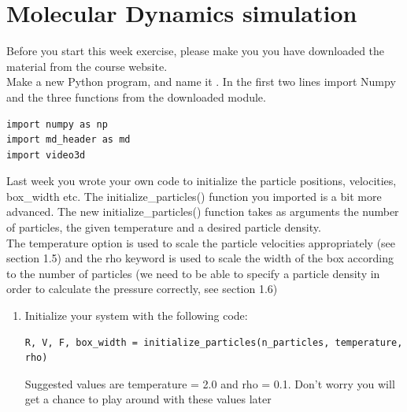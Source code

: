 \documentclass{article}
\begin{document}
\newpage

\section{Molecular Dynamics simulation}

Before you start this week exercise, please make you you have downloaded the
material from the course website.\\


Make a new Python program, and name it .
In the first two lines import Numpy and the three functions from the downloaded
module.

\begin{lstlisting}
import numpy as np
import md_header as md
import video3d
\end{lstlisting}

Last week you wrote your own code to initialize the particle positions,
velocities, box\_width etc. The initialize\_particles() function you
imported is a bit more advanced.
The new initialize\_particles() function takes as arguments the number of
particles, the given temperature and a desired particle density.\\

The temperature option is used to scale the particle velocities appropriately
(see section 1.5) and the rho keyword is used to scale the width of the box
according to the number of particles (we need to be able to specify a particle
density in order to calculate the pressure correctly, see section 1.6)

\begin{enumerate}

    \item Initialize your system with the following code:

\begin{lstlisting}
R, V, F, box_width = initialize_particles(n_particles, temperature, rho)
\end{lstlisting}

        Suggested values are temperature = 2.0 and rho = 0.1.
        Don't worry you will get a chance to play around with these values later

\end{enumerate}
\end{document}
